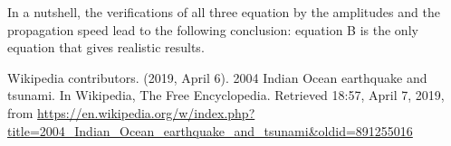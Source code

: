 \documentclass[a4paper,12pt,twoside]{article}
\begin{document}
      In a nutshell, the verifications of all three equation by the amplitudes and the propagation speed lead to the following conclusion: equation B is the only equation that gives realistic results.



  \newpage
  \begin{thebibliography}{99}
     Wikipedia contributors. (2019, April 6). 2004 Indian Ocean earthquake and tsunami. In Wikipedia, The Free Encyclopedia. Retrieved 18:57, April 7, 2019, from \url{https://en.wikipedia.org/w/index.php?title=2004_Indian_Ocean_earthquake_and_tsunami&oldid=891255016}


  \end{thebibliography}
\end{document}
